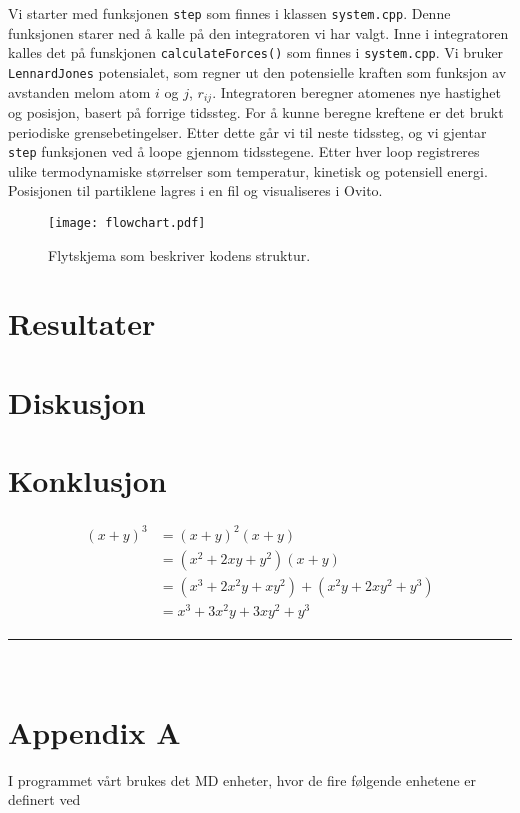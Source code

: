 \documentclass[paper=a4, fontsize=11pt]{scrartcl} %
\numberwithin{equation}{section} %
\numberwithin{figure}{section} %
\numberwithin{table}{section} %
\newcommand{\horrule}[1]{\rule{\linewidth}{#1}} %
\begin{document}
Vi starter med funksjonen \texttt{step} som finnes i klassen \texttt{system.cpp}. Denne funksjonen starer ned å kalle på den integratoren vi har valgt. Inne i integratoren kalles det på funskjonen \texttt{calculateForces()} som finnes i \texttt{system.cpp}. Vi bruker \texttt{LennardJones} potensialet, som regner ut den potensielle kraften som funksjon av avstanden melom atom $i$ og $j$, $r_{ij}$. Integratoren beregner atomenes nye hastighet og posisjon, basert på forrige tidssteg. For å kunne beregne kreftene er det brukt periodiske grensebetingelser. Etter dette går vi til neste tidssteg, og vi gjentar \texttt{step} funksjonen ved å loope gjennom tidsstegene. Etter hver loop registreres ulike termodynamiske størrelser som temperatur, kinetisk og potensiell energi. Posisjonen til partiklene lagres i en fil og visualiseres i Ovito. 



\FloatBarrier
\begin{figure}[!ht]
 \centering
 \texttt{[image: flowchart.pdf]}
 \caption{Flytskjema som beskriver kodens struktur.}
 \label{flow}
 \end{figure}
 \FloatBarrier


\section{Resultater}

\section{Diskusjon}
\section{Konklusjon}


\begin{align} 
\begin{split}
(x+y)^3 	&= (x+y)^2(x+y)\\
&=(x^2+2xy+y^2)(x+y)\\
&=(x^3+2x^2y+xy^2) + (x^2y+2xy^2+y^3)\\
&=x^3+3x^2y+3xy^2+y^3
\end{split}					
\end{align}


\horrule{2pt} \\[0.5cm] %

\section{Appendix A}
I programmet vårt brukes det MD enheter, hvor de fire følgende enhetene er definert ved
\end{document}
